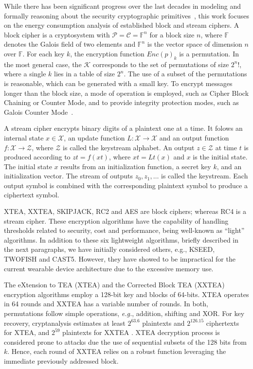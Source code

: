 \documentclass[journal]{IEEEtran}
\newcommand{\gn}[1]{{\color{red}{[#1]}}}
\begin{document}
While there has been significant progress over the last decades in modeling and formally reasoning about the security cryptographic primitives~\cite{KatzL2014}, this work focuses on the energy consumption analysis of established block and stream ciphers. %
A block cipher is a cryptosystem with $\mathcal{P} = \mathcal{C} =  \mathbb{F}^n$ for a block size $n$, where  $\mathbb{F}$ denotes the Galois field of two elements and $\mathbb{F}^n$ is the vector space of dimension $n$ over $\mathbb{F}$. For each key $k$, the encryption function $Enc(p)_k$ is a permutation. In the most general case, the $\mathcal{K}$ corresponds to the set of permutations of size $2^n!$, where a single $k$ lies in a table of size $2^n$. %
The use of a subset of the permutations is reasonable, which can be generated with a small key. To encrypt messages longer than the block size, a mode of operation is employed, such as Cipher Block Chaining or Counter Mode, and to provide integrity protection modes, such as Galois Counter Mode~\cite{KatzL2014}. 

A stream cipher encrypts binary digits of a plaintext one at a time. %
It folows an internal state $x \in \mathcal{X}$, an update function $L: \mathcal{X} \rightarrow \mathcal{X}$ and an output function $f: \mathcal{X} \rightarrow \mathcal{Z}$, where $\mathcal{Z}$ is called the keystream alphabet. An output $z \in \mathcal{Z}$ at time $t$ is produced according to $zt = f(xt)$, where $xt = Lt(x)$ and $x$ is the initial state. The initial state $x$ results from an initialization function, a secret key $k$, and an initialization vector. The stream of outputs $z_0, z_1, \ldots$ is called the keystream. Each output symbol is combined with the corresponding plaintext symbol to produce a ciphertext symbol.

XTEA, XXTEA, SKIPJACK, RC2 and AES are block ciphers; whereas RC4 is a stream cipher. These encryption algorithms have the capability of handling thresholds related to security, cost and performance, being well-known as ``light'' algorithms. In addition to these six lightweight algorithms, briefly described in the next paragraphs, we have initially considered others, e.g., KSEED, TWOFISH and CAST5. However, they have showed to be impractical for the current wearable device architecture due to the excessive memory use.

The eXtension to TEA (XTEA) and the Corrected Block TEA (XXTEA) encryption algorithms employ a 128-bit key and blocks of 64-bits. XTEA operates in 64 rounds and XXTEA has a variable number of rounds. In both, permutations follow simple operations, {\em e.g.}, addition, shifting and XOR. For key recovery, cryptanalysis estimates at least $2^{63.6}$ plaintexts and $2^{126.15}$ ciphertexts for XTEA, and $2^{59}$ plaintexts for XXTEA \cite{moon2002impossible}%
. XTEA decryption process is considered prone to attacks due the use of sequential subsets of the 128 bits from $k$. %
Hence, each round of XXTEA relies on a robust function leveraging the immediate previously addressed block. 
\end{document}
